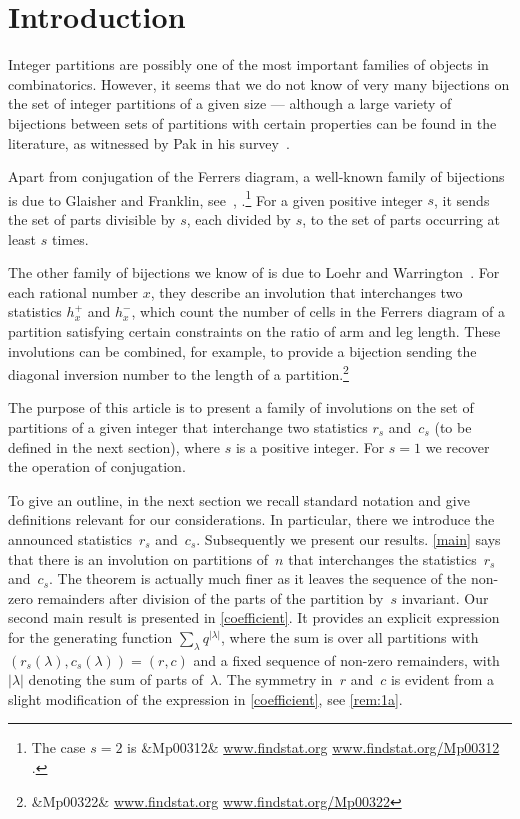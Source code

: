 \documentclass[12pt,reqno]{amsart}
\numberwithin{equation}{section}
\newcommand{\FindStat}[1]{%
  \ifx&#1&%
  \url{www.findstat.org}%
  \else \url{www.findstat.org/#1}%
  \fi}%
\theoremstyle{definition}
\begin{document}


\maketitle

\section{Introduction}

Integer partitions are possibly one of the most important families of
objects in combinatorics.  However, it seems that
we do not know of very many bijections on the set of integer
partitions of a given size --- although a large variety of bijections
between sets of partitions with certain properties can be found in
the literature, as witnessed by Pak {in his} survey~\cite{MR2267263}.

Apart from conjugation of the Ferrers diagram, a well-known family of
bijections is due to Glaisher and Franklin,
see~\cite[Sec.~3.3]{MR2267263}, \cite{zbMATH02703427}.\footnote{The
  case $s=2$ is \FindStat{Mp00312}.} For a given positive integer $s$,
it sends the set of parts divisible by $s$, each divided by $s$, to
the set of parts occurring at least $s$ times.

The other family of bijections we know of is due to Loehr and
Warrington~\cite{MR2475023}.  For each rational number $x$, they
describe an involution that interchanges two statistics $h^+_x$ and
$h^-_x$, which count the number of cells in the Ferrers diagram of a
partition satisfying certain constraints on the ratio of arm and leg
length.  These involutions can be combined, for example, to provide a
bijection sending the diagonal inversion number to the length of a
partition.\footnote{\FindStat{Mp00322}}

The purpose of this article is to present a family of involutions
on the set of partitions of a given integer that interchange two statistics
$r_s$ and~$c_s$ (to be defined in the next section), where $s$ is a
positive integer. For $s=1$ we recover the operation of conjugation.

To give an outline,
in the next section we recall standard notation and give
definitions relevant for our considerations. In particular,
there we introduce the announced statistics~$r_s$ and~$c_s$.
Subsequently we present our results. \cref{main} says that there
is an involution on partitions of~$n$ that interchanges the
statistics~$r_s$ and~$c_s$. The theorem is actually much finer as it
leaves the sequence of the non-zero remainders after division of the
parts of the partition by~$s$ invariant. Our second main result is presented in
\cref{coefficient}. It provides an explicit expression for the
generating function $\sum_\lambda q^{|\lambda|}$,
where the sum is over all partitions with
$(r_s(\lambda),c_s(\lambda))=(r,c)$ and a fixed sequence of
non-zero remainders, with $|\lambda|$ denoting the sum of parts of~$\lambda$.
The symmetry in~$r$ and~$c$ is evident from a slight modification of the expression in \cref{coefficient}, see
\cref{rem:1a}. 
\end{document}
